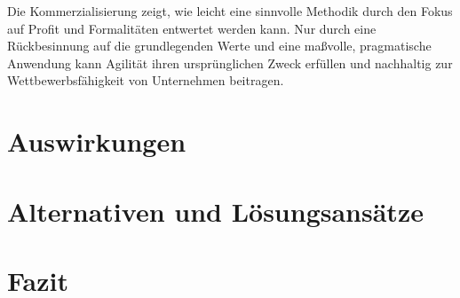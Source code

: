 \documentclass[ngerman]{seminarvorlage}
\begin{document}
Die Kommerzialisierung zeigt, wie leicht eine sinnvolle Methodik durch den Fokus auf Profit und Formalitäten entwertet werden kann. Nur durch eine Rückbesinnung auf die grundlegenden Werte und eine maßvolle, pragmatische Anwendung kann Agilität ihren ursprünglichen Zweck erfüllen und nachhaltig zur Wettbewerbsfähigkeit von Unternehmen beitragen.
\cite{heise.2024}

\section{Auswirkungen}

\section{Alternativen und Lösungsansätze}

\section{Fazit}


%
%


\end{document}
